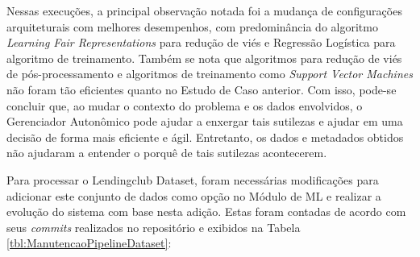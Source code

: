 \documentclass[portugues]{ic-tese}
\begin{document}
\begin{table}[H]
\begin{center}
  \caption{Melhores configurações escolhidas pelo Gerenciador Autonômico \\ Uso dos algoritmos implementados - 25\% Avaliação/75\% \textit{Fairness}}
\label{tbl:ScoreMAPEKLendingclubGeral2575}
\end{center}
\end{table}

Nessas execuções, a principal observação notada foi a mudança de configurações arquiteturais com melhores desempenhos, com predominância do algoritmo \textit{Learning Fair Representations} para redução de viés e Regressão Logística para algoritmo de treinamento. Também se nota que algoritmos para redução de viés de pós-processamento e algoritmos de treinamento como \textit{Support Vector Machines} não foram tão eficientes quanto no Estudo de Caso anterior. Com isso, pode-se concluir que, ao mudar o contexto do problema e os dados envolvidos, o Gerenciador Autonômico pode ajudar a enxergar tais sutilezas e ajudar em uma decisão de forma mais eficiente e ágil. Entretanto, os dados e metadados obtidos não ajudaram a entender o porquê de tais sutilezas acontecerem.

Para processar o Lendingclub Dataset, foram necessárias modificações para adicionar este conjunto de dados como opção no Módulo de ML e realizar a evolução do sistema com base nesta adição. Estas foram contadas de acordo com seus \textit{commits} realizados no repositório e exibidos  na Tabela \ref{tbl:ManutencaoPipelineDataset}:
\end{document}
